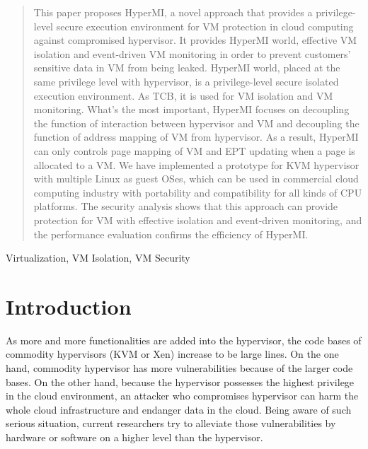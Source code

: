 \documentclass[conference]{IEEEtran}
\begin{document}
\begin{abstract}
This paper proposes HyperMI, a novel approach that provides a privilege-level secure execution environment for VM protection in cloud computing against compromised hypervisor. 
It provides HyperMI world, effective VM isolation and event-driven VM monitoring in order to prevent customers' sensitive data in VM from being leaked.
HyperMI world, placed at the same privilege level with hypervisor, is a privilege-level secure isolated execution environment. As TCB, it is used for VM isolation and VM monitoring. 
What's the most important, HyperMI focuses on decoupling the function of interaction between hypervisor and VM and decoupling the function of address mapping of VM from hypervisor.
As a result, HyperMI can only controls page mapping of VM and EPT updating when a page is allocated to a VM.
We have implemented a prototype for KVM hypervisor with multiple Linux as guest OSes, which can be used in commercial
cloud computing industry with portability and compatibility for all kinds of CPU platforms. The security analysis shows that this approach can provide protection for VM with effective isolation and event-driven monitoring, and the performance evaluation confirms the efficiency of HyperMI.


\end{abstract}

\begin{IEEEkeywords}
Virtualization, VM Isolation, VM Security
\end{IEEEkeywords}

\section{Introduction}



As more and more functionalities are added into the hypervisor, the code bases of commodity hypervisors (KVM or Xen) increase to be large lines. On the one hand, commodity hypervisor has more vulnerabilities because of the larger code bases. On the other hand, because the hypervisor possesses the highest privilege in the cloud environment, an attacker who compromises hypervisor can harm the whole cloud infrastructure and endanger data in the cloud.
Being aware of such serious situation, current researchers try to alleviate those vulnerabilities by hardware or software on a higher level than the hypervisor.
\end{document}
